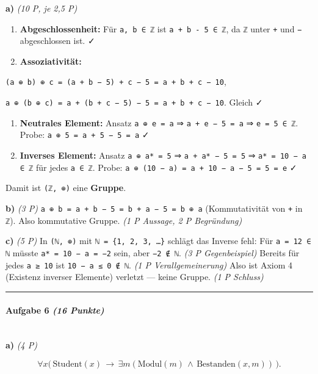 \documentclass[11pt, a4paper]{article}
\begin{document}
\textbf{a)} \textit{(10 P, je 2,5 P)}


\begin{enumerate}
  \item \textbf{Abgeschlossenheit:} Für \texttt{a, b ∈ ℤ} ist \texttt{a + b - 5 ∈ ℤ}, da \texttt{ℤ} unter \texttt{+} und \texttt{−} abgeschlossen ist. ✓
  \item \textbf{Assoziativität:}
\end{enumerate}
\texttt{(a ⊕ b) ⊕ c = (a + b − 5) + c − 5 = a + b + c − 10},

\texttt{a ⊕ (b ⊕ c) = a + (b + c − 5) − 5 = a + b + c − 10}. Gleich ✓

\begin{enumerate}
  \item \textbf{Neutrales Element:} Ansatz \texttt{a ⊕ e = a} ⇒ \texttt{a + e − 5 = a} ⇒ \texttt{e = 5 ∈ ℤ}. Probe: \texttt{a ⊕ 5 = a + 5 − 5 = a} ✓
  \item \textbf{Inverses Element:} Ansatz \texttt{a ⊕ a* = 5} ⇒ \texttt{a + a* − 5 = 5} ⇒ \texttt{a* = 10 − a ∈ ℤ} für jedes \texttt{a ∈ ℤ}. Probe: \texttt{a ⊕ (10 − a) = a + 10 − a − 5 = 5 = e} ✓
\end{enumerate}

Damit ist \texttt{(ℤ, ⊕)} eine \textbf{Gruppe}.


\textbf{b)} \textit{(3 P)} \texttt{a ⊕ b = a + b − 5 = b + a − 5 = b ⊕ a} (Kommutativität von \texttt{+} in \texttt{ℤ}). Also kommutative Gruppe. \textit{(1 P Aussage, 2 P Begründung)}


\textbf{c)} \textit{(5 P)} In \texttt{(ℕ, ⊕)} mit \texttt{ℕ = \{1, 2, 3, …\}} schlägt das Inverse fehl: Für \texttt{a = 12 ∈ ℕ} müsste \texttt{a* = 10 − a = −2} sein, aber \texttt{−2 ∉ ℕ}. \textit{(3 P Gegenbeispiel)} Bereits für jedes \texttt{a ≥ 10} ist \texttt{10 − a ≤ 0 ∉ ℕ}. \textit{(1 P Verallgemeinerung)} Also ist Axiom 4 (Existenz inverser Elemente) verletzt — keine Gruppe. \textit{(1 P Schluss)}



\noindent\textcolor{rulegray}{\rule{\linewidth}{0.4pt}}


\paragraph{Aufgabe 6 \textit{(16 Punkte)}}\mbox{}\\[2pt]

\textbf{a)} \textit{(4 P)}

\[
\forall x \big(\, \text{Student}(x) \,\to\, \exists m (\text{Modul}(m) \,\land\, \text{Bestanden}(x, m)) \,\big).
\]
\end{document}
